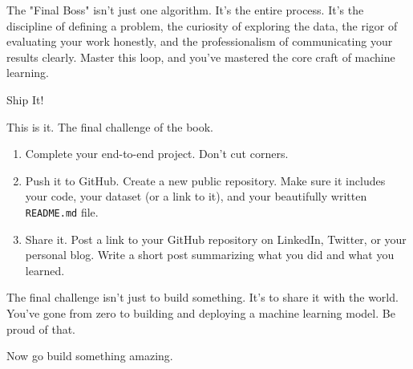\documentclass[11pt, letterpaper, openany]{book}
\begin{document}
The "Final Boss" isn't just one algorithm. It's the entire process. It's the discipline of defining a problem, the curiosity of exploring the data, the rigor of evaluating your work honestly, and the professionalism of communicating your results clearly. Master this loop, and you've mastered the core craft of machine learning.

\begin{challengebox}
Ship It!

This is it. The final challenge of the book.
\begin{enumerate}
    \item Complete your end-to-end project. Don't cut corners.
    \item Push it to GitHub. Create a new public repository. Make sure it includes your code, your dataset (or a link to it), and your beautifully written \texttt{README.md} file.
    \item Share it. Post a link to your GitHub repository on LinkedIn, Twitter, or your personal blog. Write a short post summarizing what you did and what you learned.
\end{enumerate}
The final challenge isn't just to build something. It's to share it with the world. You've gone from zero to building and deploying a machine learning model. Be proud of that.

Now go build something amazing.
\end{challengebox}
\end{document}
